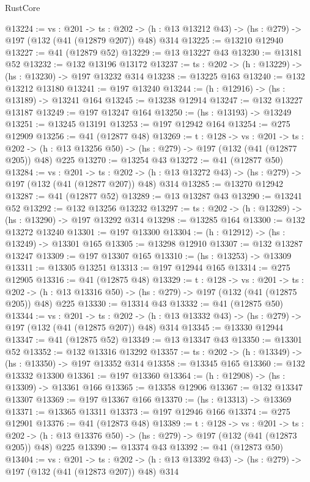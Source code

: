 \begin{lexlean}{RustCore}
\begin{coremodule}
@13224 := {vs : @201} ->
  {ts : @202} -> (h : @13 @13212 @43) -> (hs : @279) -> @197 (@132 (@41 (@12879 @207)) @48) @314
@13225 := @13210 @12940
@13227 := @41 (@12879 @52)
@13229 := @13 @13227 @43
@13230 := @13181 @52
@13232 := @132 @13196 @13172
@13237 := {ts : @202} -> (h : @13229) -> (hs : @13230) -> @197 @13232 @314
@13238 := @13225 @163
@13240 := @132 @13212 @13180
@13241 := @197 @13240
@13244 := (h : @12916) -> (hs : @13189) -> @13241 @164
@13245 := @13238 @12914
@13247 := @132 @13227 @13187
@13249 := @197 @13247 @164
@13250 := (hs : @13193) -> @13249
@13251 := @13245 @13191
@13253 := @197 @12942 @164
@13254 := @275 @12909
@13256 := @41 (@12877 @48)
@13269 := {t : @128} ->
  {vs : @201} ->
  {ts : @202} -> (h : @13 @13256 @50) -> (hs : @279) -> @197 (@132 (@41 (@12877 @205)) @48) @225
@13270 := @13254 @43
@13272 := @41 (@12877 @50)
@13284 := {vs : @201} ->
  {ts : @202} -> (h : @13 @13272 @43) -> (hs : @279) -> @197 (@132 (@41 (@12877 @207)) @48) @314
@13285 := @13270 @12942
@13287 := @41 (@12877 @52)
@13289 := @13 @13287 @43
@13290 := @13241 @52
@13292 := @132 @13256 @13232
@13297 := {ts : @202} -> (h : @13289) -> (hs : @13290) -> @197 @13292 @314
@13298 := @13285 @164
@13300 := @132 @13272 @13240
@13301 := @197 @13300
@13304 := (h : @12912) -> (hs : @13249) -> @13301 @165
@13305 := @13298 @12910
@13307 := @132 @13287 @13247
@13309 := @197 @13307 @165
@13310 := (hs : @13253) -> @13309
@13311 := @13305 @13251
@13313 := @197 @12944 @165
@13314 := @275 @12905
@13316 := @41 (@12875 @48)
@13329 := {t : @128} ->
  {vs : @201} ->
  {ts : @202} -> (h : @13 @13316 @50) -> (hs : @279) -> @197 (@132 (@41 (@12875 @205)) @48) @225
@13330 := @13314 @43
@13332 := @41 (@12875 @50)
@13344 := {vs : @201} ->
  {ts : @202} -> (h : @13 @13332 @43) -> (hs : @279) -> @197 (@132 (@41 (@12875 @207)) @48) @314
@13345 := @13330 @12944
@13347 := @41 (@12875 @52)
@13349 := @13 @13347 @43
@13350 := @13301 @52
@13352 := @132 @13316 @13292
@13357 := {ts : @202} -> (h : @13349) -> (hs : @13350) -> @197 @13352 @314
@13358 := @13345 @165
@13360 := @132 @13332 @13300
@13361 := @197 @13360
@13364 := (h : @12908) -> (hs : @13309) -> @13361 @166
@13365 := @13358 @12906
@13367 := @132 @13347 @13307
@13369 := @197 @13367 @166
@13370 := (hs : @13313) -> @13369
@13371 := @13365 @13311
@13373 := @197 @12946 @166
@13374 := @275 @12901
@13376 := @41 (@12873 @48)
@13389 := {t : @128} ->
  {vs : @201} ->
  {ts : @202} -> (h : @13 @13376 @50) -> (hs : @279) -> @197 (@132 (@41 (@12873 @205)) @48) @225
@13390 := @13374 @43
@13392 := @41 (@12873 @50)
@13404 := {vs : @201} ->
  {ts : @202} -> (h : @13 @13392 @43) -> (hs : @279) -> @197 (@132 (@41 (@12873 @207)) @48) @314

\end{coremodule}
\end{lexlean}
